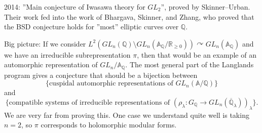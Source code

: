 \documentclass{article}
\theoremstyle{definition}
\begin{document}
2014: ''Main conjecture of Iwasawa theory for $GL_2$'', proved by Skinner--Urban. Their work fed into the work of Bhargava, Skinner, and Zhang, who proved that the BSD conjecture holds for ''most'' elliptic curves over $\mathbb{Q}$.
\vspace{1mm}
 
Big picture: If we consider $L^2\left(GL_{n}(\mathbb{Q})\setminus GL_n(\mathbb{A}_{\mathbb{Q}}/\mathbb{R}_{\ge 0})\right) \curvearrowright GL_n(\mathbb{A}_\mathbb{Q})$ and we have an irreducible subrepresentation $\pi$, then that would be an example of an automorphic representation of $GL_n/\mathbb{A}_\mathbb{Q}$. The most general part of the Langlands program gives a conjecture that should be a bijection between $$\{\text{cuspidal automorphic representations of }GL_n(\mathbb{A}/\mathbb{Q})\}$$ and $$\{\text{compatible systems of irreducible representations of }(\rho_{\lambda}: G_{\mathbb{Q}} \to GL_n(\overline{\mathbb{Q}}_\lambda))_{\lambda}\}.$$ We are very far from proving this. One case we understand quite well is taking $n=2$, so $\pi$ corresponds to holomorphic modular forms.
\end{document}
